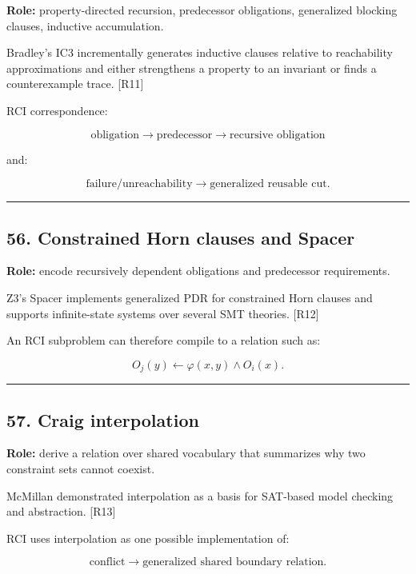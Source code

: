 \documentclass[
]{article}
\begin{document}
\textbf{Role:} property-directed recursion, predecessor obligations,
generalized blocking clauses, inductive accumulation.

Bradley's IC3 incrementally generates inductive clauses relative to
reachability approximations and either strengthens a property to an
invariant or finds a counterexample trace. {[}R11{]}

RCI correspondence:

\[
\boxed{
\text{obligation}
\to
\text{predecessor}
\to
\text{recursive obligation}
}
\]

and:

\[
\boxed{
\text{failure/unreachability}
\to
\text{generalized reusable cut}.
}
\]

\begin{center}\rule{0.5\linewidth}{0.5pt}\end{center}

\subsection{56. Constrained Horn clauses and
Spacer}\label{constrained-horn-clauses-and-spacer}

\textbf{Role:} encode recursively dependent obligations and predecessor
requirements.

Z3's Spacer implements generalized PDR for constrained Horn clauses and
supports infinite-state systems over several SMT theories. {[}R12{]}

An RCI subproblem can therefore compile to a relation such as:

\[
O_j(y)
\leftarrow
\varphi(x,y)
\land
O_i(x).
\]

\begin{center}\rule{0.5\linewidth}{0.5pt}\end{center}

\subsection{57. Craig interpolation}\label{craig-interpolation}

\textbf{Role:} derive a relation over shared vocabulary that summarizes
why two constraint sets cannot coexist.

McMillan demonstrated interpolation as a basis for SAT-based model
checking and abstraction. {[}R13{]}

RCI uses interpolation as one possible implementation of:

\[
\boxed{
\text{conflict}
\to
\text{generalized shared boundary relation}.
}
\]
\end{document}
